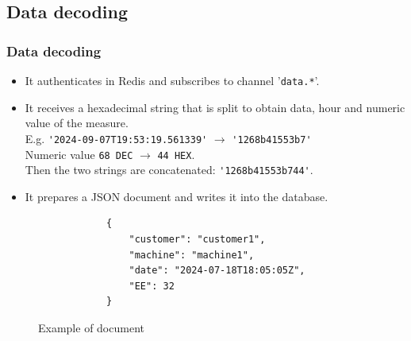 \subsection{Data decoding}
\begin{frame}[containsverbatim]
	\frametitle{Data decoding}
	
	\begin{itemize}
		\item It authenticates in Redis and subscribes to channel '\verb|data.*|'.
		\item It receives a hexadecimal string that is split to obtain data, hour and numeric value of the measure.\\
		E.g. \verb|'2024-09-07T19:53:19.561339'| $\rightarrow$ \verb|'1268b41553b7'|\\
		Numeric value \verb|68 DEC| $\rightarrow$ \verb|44 HEX|.\\
		Then the two strings are concatenated: \verb|'1268b41553b744'|.
		\item It prepares a JSON document and writes it into the database.
	\end{itemize}
	
	\begin{figure}[h]
		\centering
		\begin{verbatim}
			{
				"customer": "customer1",
				"machine": "machine1",
				"date": "2024-07-18T18:05:05Z",
				"EE": 32
			}
		\end{verbatim}
		\caption{Example of document}
	\end{figure}
	
\end{frame}


